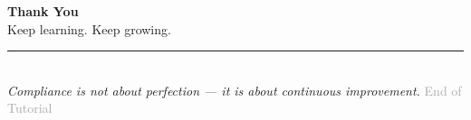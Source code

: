 \documentclass[12pt,aspectratio=169]{beamer}
\begin{document}
\begin{frame}
\centering
\vspace{2.5cm}
{\fontsize{22}{26}\selectfont \textbf{Thank You}} \\[0.3cm]
{\fontsize{14}{17}\selectfont Keep learning. Keep growing.} \\[0.2cm]
\rule{3cm}{1pt} \\[0.2cm]
{\fontsize{10}{12}\selectfont \textit{Compliance is not about perfection — it is about continuous improvement.}}
\vspace{0.5cm}
{\fontsize{9}{11}\selectfont \textcolor{darkgray}{End of Tutorial}}
\end{frame}
\end{document}
